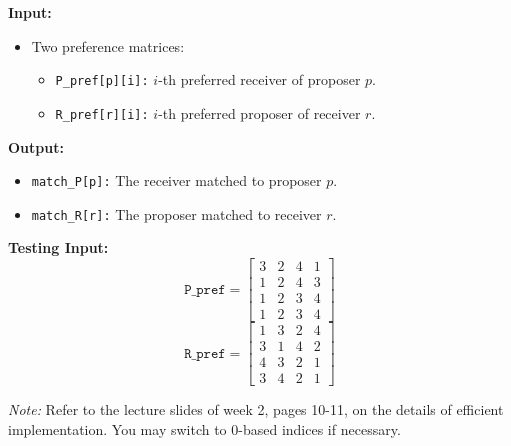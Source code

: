 \documentclass[12pt]{article}
\begin{document}
\textbf{Input:}
\begin{itemize}
    \item Two preference matrices:
    \begin{itemize}
        \item \texttt{P\_pref[p][i]:} $i$-th preferred receiver of proposer $p$.
        \item \texttt{R\_pref[r][i]:} $i$-th preferred proposer of receiver $r$.
    \end{itemize}
\end{itemize}

\textbf{Output:}
\begin{itemize}
    \item \texttt{match\_P[p]:} The receiver matched to proposer $p$.
    \item \texttt{match\_R[r]:} The proposer matched to receiver $r$.
\end{itemize}

\textbf{Testing Input:}
\[
\texttt{P\_pref} = 
\begin{bmatrix}
3 & 2 & 4 & 1 \\
1 & 2 & 4 & 3 \\
1 & 2 & 3 & 4 \\
1 & 2 & 3 & 4
\end{bmatrix}
\]
\[
\texttt{R\_pref} = 
\begin{bmatrix}
1 & 3 & 2 & 4 \\
3 & 1 & 4 & 2 \\
4 & 3 & 2 & 1 \\
3 & 4 & 2 & 1
\end{bmatrix}
\]

\textit{Note:} Refer to the lecture slides of week 2, pages 10-11, on the details of efficient implementation. You may switch to 0-based indices if necessary.
\end{document}
